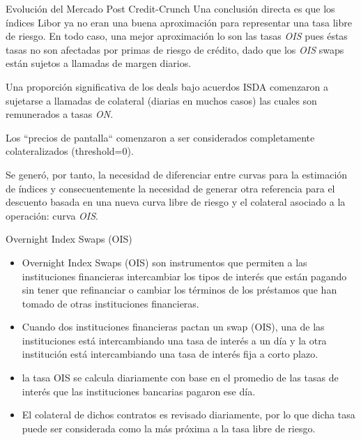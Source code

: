\documentclass[11pt]{beamer}
\begin{document}
\begin{frame}{Evolución del Mercado Post Credit-Crunch}
	Una conclusión directa es que los índices Libor ya no eran una buena aproximación para representar una tasa libre de riesgo. En todo caso, una mejor aproximación lo son las tasas \textit{OIS} pues éstas tasas no son afectadas por primas de riesgo de crédito, dado que los \textit{OIS} swaps están sujetos a llamadas de margen diarios.
	
	Una proporción significativa de los deals bajo acuerdos ISDA comenzaron a sujetarse a llamadas de colateral (diarias  en muchos casos) las cuales son remunerados a tasas \textit{ON}.
	
	Los “precios de pantalla“ comenzaron a ser considerados  completamente colateralizados (threshold=0). 
	
	Se generó, por tanto, la necesidad de diferenciar entre curvas para la estimación de índices y consecuentemente la necesidad de generar otra referencia para el descuento basada en una nueva curva libre de riesgo y el colateral asociado a la operación: curva \textit{OIS}.
	
\end{frame}
\begin{frame}{Overnight Index Swaps (OIS)}
	\begin{itemize}
		\item 
		Overnight Index Swaps (OIS) son instrumentos que permiten a las instituciones financieras intercambiar los tipos de interés que están pagando sin tener que refinanciar o cambiar los términos de los préstamos que han tomado de otras instituciones financieras. 
		\item Cuando dos instituciones financieras pactan un swap (OIS), una de las instituciones está intercambiando una tasa de interés a un día y la otra institución está intercambiando una tasa de interés fija a corto plazo.
		\item la tasa OIS se calcula diariamente con base en el promedio de las tasas de interés que las instituciones bancarias pagaron ese día.
		\item El colateral de dichos contratos es revisado diariamente, por lo que dicha tasa puede ser considerada como la más próxima a la tasa libre de riesgo.
	\end{itemize}
\end{frame}
\end{document}
